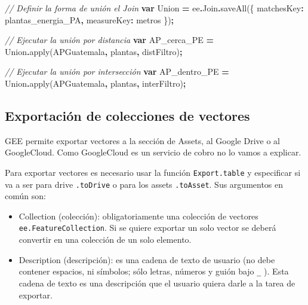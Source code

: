 \documentclass[
  12pt,
  letterpaper,
  twoside]{book}
\newenvironment{Shaded}{\begin{snugshade}}{\end{snugshade}}
\newcommand{\AttributeTok}[1]{\textcolor[rgb]{0.77,0.63,0.00}{#1}}
\newcommand{\CommentTok}[1]{\textcolor[rgb]{0.56,0.35,0.01}{\textit{#1}}}
\newcommand{\DataTypeTok}[1]{\textcolor[rgb]{0.13,0.29,0.53}{#1}}
\newcommand{\FunctionTok}[1]{\textcolor[rgb]{0.00,0.00,0.00}{#1}}
\newcommand{\KeywordTok}[1]{\textcolor[rgb]{0.13,0.29,0.53}{\textbf{#1}}}
\newcommand{\NormalTok}[1]{#1}
\newcommand{\OperatorTok}[1]{\textcolor[rgb]{0.81,0.36,0.00}{\textbf{#1}}}
\newcommand{\StringTok}[1]{\textcolor[rgb]{0.31,0.60,0.02}{#1}}
\providecommand{\tightlist}{%
  \setlength{\itemsep}{0pt}\setlength{\parskip}{0pt}}
\begin{document}
\begin{Shaded}
\begin{Highlighting}[]
\CommentTok{// Definir la forma de unión el Join}
\KeywordTok{var}\NormalTok{ Union }\OperatorTok{=}\NormalTok{ ee}\OperatorTok{.}\AttributeTok{Join}\OperatorTok{.}\FunctionTok{saveAll}\NormalTok{(\{}
  \DataTypeTok{matchesKey}\OperatorTok{:} \StringTok{\textquotesingle{}plantas\_energia\_PA\textquotesingle{}}\OperatorTok{,}
  \DataTypeTok{measureKey}\OperatorTok{:} \StringTok{\textquotesingle{}metros\textquotesingle{}}
\NormalTok{\})}\OperatorTok{;}

\CommentTok{// Ejecutar la unión por distancia}
\KeywordTok{var}\NormalTok{ AP\_cerca\_PE }\OperatorTok{=}\NormalTok{ Union}\OperatorTok{.}\FunctionTok{apply}\NormalTok{(APGuatemala}\OperatorTok{,}\NormalTok{ plantas}\OperatorTok{,}\NormalTok{ distFiltro)}\OperatorTok{;}

\CommentTok{// Ejecutar la unión por intersección}
\KeywordTok{var}\NormalTok{ AP\_dentro\_PE }\OperatorTok{=}\NormalTok{ Union}\OperatorTok{.}\FunctionTok{apply}\NormalTok{(APGuatemala}\OperatorTok{,}\NormalTok{ plantas}\OperatorTok{,}\NormalTok{ interFiltro)}\OperatorTok{;}
\end{Highlighting}
\end{Shaded}

\hypertarget{exportaciuxf3n-de-colecciones-de-vectores}{%
\subsection{Exportación de colecciones de vectores}\label{exportaciuxf3n-de-colecciones-de-vectores}}

GEE permite exportar vectores a la sección de Assets, al Google Drive o al GoogleCloud. Como GoogleCloud es un servicio de cobro no lo vamos a explicar.

Para exportar vectores es necesario usar la función \texttt{Export.table} y especificar si va a ser para drive \texttt{.toDrive} o para los assets \texttt{.toAsset}. Sus argumentos en común son:

\begin{itemize}
\tightlist
\item
  Collection (colección): obligatoriamente una colección de vectores \texttt{ee.FeatureCollection}. Si se quiere exportar un solo vector se deberá convertir en una colección de un solo elemento.
\item
  Description (descripción): es una cadena de texto de usuario (no debe contener espacios, ni símbolos; sólo letras, números y guión bajo \texttt{\_} ). Esta cadena de texto es una descripción que el usuario quiera darle a la tarea de exportar.
\end{itemize}
\end{document}
